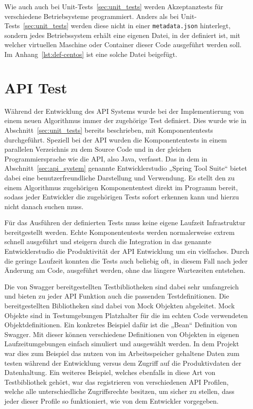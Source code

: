 Wie auch auch bei Unit\hyp{}Tests~\ref{sec:unit_tests} werden Akzeptanztests für
verschiedene Betriebsysteme programmiert. Anders als bei
Unit\hyp{}Tests~\ref{sec:unit_tests} werden diese nicht in einer
\texttt{metadata.json} hinterlegt, sondern jedes Betriebssystem erhält eine
eigenen Datei, in der definiert ist, mit welcher virtuellen Maschine oder
Container dieser Code ausgeführt werden soll. Im Anhang~\ref{lst:def-centos}
ist eine solche Datei beigefügt.
\mr%

\section{API Test}
\label{sec:api_test}
Während der Entwicklung des API Systems wurde bei der Implementierung von einem
neuen Algorithmus immer der zugehörige Test definiert. Dies wurde wie in
Abschnitt~\ref{sec:unit_tests} bereits beschrieben, mit Komponententests
durchgeführt. Speziell bei der API wurden die Komponententests in einem
parallelen Verzeichnis zu dem Source Code und in der gleichen
Programmiersprache wie die API, also Java, verfasst. Das in dem in
Abschnitt~\ref{sec:api_system} genannte Entwicklerstudio „Spring Tool Suite“
bietet dabei eine benutzerfreundliche Darstellung und Verwendung. Es stellt den
zu einem Algorithmus zugehörigen Komponententest direkt im Programm bereit,
sodass jeder Entwickler die zugehörigen Tests sofort erkennen kann und hierzu
nicht danach suchen muss.

Für das Ausführen der definierten Tests muss keine eigene Laufzeit
Infrastruktur bereitgestellt werden. Echte Komponententests werden
normalerweise extrem schnell ausgeführt und steigern durch die Integration in
das genannte Entwicklerstudio die Produktivität der API Entwicklung um ein
vielfaches. Durch die geringe Laufzeit konnten die Tests auch beliebig oft, in
diesem Fall nach jeder Änderung am Code, ausgeführt werden, ohne das längere
Wartezeiten entstehen.

Die von Swagger bereitgestellten Testbibliotheken sind dabei sehr umfangreich
und bieten zu jeder API Funktion auch die passenden Testdefinitionen. Die
bereitgestellten Bibliotheken sind dabei von Mock Objekten abgeleitet. Mock
Objekte sind in Testumgebungen Platzhalter für die im echten Code verwendeten
Objektdefinitionen. Ein konkretes Beispiel dafür ist die „Bean“ Definition von
Swagger. Mit dieser können verschiedene Definitionen von Objekten in eigenen
Laufzeitumgebungen einfach simuliert und ausgewählt werden. In dem Projekt war
dies zum Beispiel das nutzen von im Arbeitsspeicher gehaltene Daten zum testen
während der Entwicklung versus dem Zugriff auf die Produktivdaten der
Datenhaltung. Ein weiteres Beispiel, welches ebenfalls in diese Art von
Testbibliothek gehört, war das registrieren von verschiedenen API Profilen,
welche alle unterschiedliche Zugriffsrechte besitzen, um sicher zu stellen,
dass jeder dieser Profile so funktioniert, wie von dem Entwickler vorgegeben.

